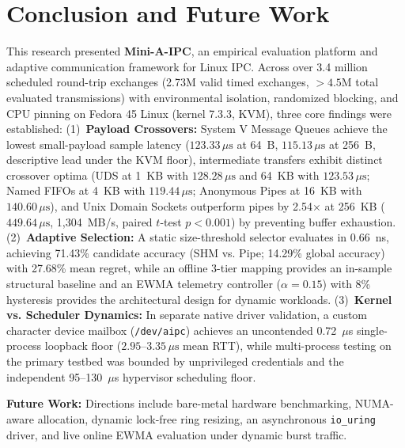 \clearpage

\section{Conclusion and Future Work}
\label{sec:conclusion}

This research presented \textbf{Mini-A-IPC}, an empirical evaluation platform and adaptive communication framework for Linux IPC. Across over 3.4 million scheduled round-trip exchanges (2.73M valid timed exchanges, $>4.5$M total evaluated transmissions) with environmental isolation, randomized blocking, and CPU pinning on Fedora 45 Linux (kernel 7.3.3, KVM), three core findings were established:
(1)~\textbf{Payload Crossovers:} System V Message Queues achieve the lowest small-payload sample latency ($123.33\,\mu\text{s}$ at 64~B, $115.13\,\mu\text{s}$ at 256~B, descriptive lead under the KVM floor), intermediate transfers exhibit distinct crossover optima (UDS at 1~KB with $128.28\,\mu\text{s}$ and 64~KB with $123.53\,\mu\text{s}$; Named FIFOs at 4~KB with $119.44\,\mu\text{s}$; Anonymous Pipes at 16~KB with $140.60\,\mu\text{s}$), and Unix Domain Sockets outperform pipes by 2.54$\times$ at 256~KB ($449.64\,\mu\text{s}$, 1,304~MB/s, paired $t$-test $p < 0.001$) by preventing buffer exhaustion.
(2)~\textbf{Adaptive Selection:} A static size-threshold selector evaluates in 0.66~ns, achieving 71.43\% candidate accuracy (SHM vs. Pipe; 14.29\% global accuracy) with 27.68\% mean regret, while an offline 3-tier mapping provides an in-sample structural baseline and an EWMA telemetry controller ($\alpha=0.15$) with 8\% hysteresis provides the architectural design for dynamic workloads.
(3)~\textbf{Kernel vs. Scheduler Dynamics:} In separate native driver validation, a custom character device mailbox (\texttt{/dev/aipc}) achieves an uncontended 0.72~$\mu$s single-process loopback floor ($2.95\text{--}3.35\,\mu\text{s}$ mean RTT), while multi-process testing on the primary testbed was bounded by unprivileged credentials and the independent 95--130~$\mu$s hypervisor scheduling floor.

\textbf{Future Work:} Directions include bare-metal hardware benchmarking, NUMA-aware allocation, dynamic lock-free ring resizing, an asynchronous \texttt{io\_uring} driver, and live online EWMA evaluation under dynamic burst traffic.

\balance
